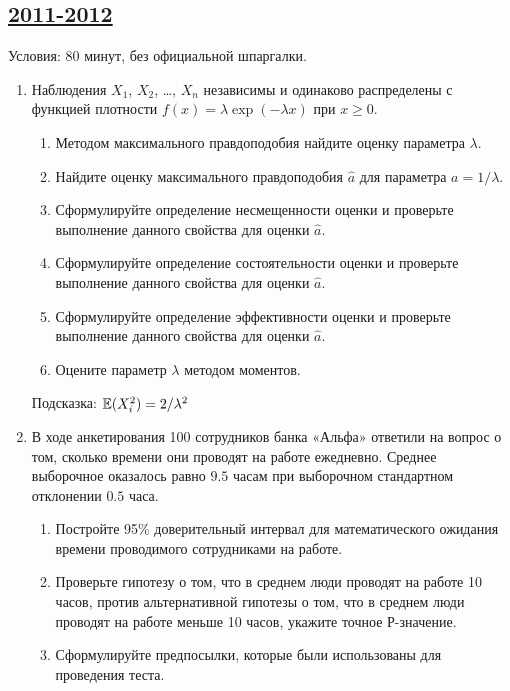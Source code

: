 
\subsection[2011-2012]{\hyperref[sec:sol_kr_03_2011_2012]{2011-2012}}
\label{sec:kr_03_2011_2012}


Условия: 80 минут, без официальной шпаргалки.

\begin{enumerate}
\item Наблюдения $X_1$, $X_2$, \ldots, $X_n$ независимы и одинаково распределены с функцией плотности $f(x)=\lambda \exp(-\lambda x)$ при $x\geq 0$.
\begin{enumerate}
\item Методом максимального правдоподобия найдите оценку параметра  $\lambda$.
\item Найдите оценку максимального правдоподобия $\hat{a}$ для параметра $a=1/\lambda$.
\item Сформулируйте определение несмещенности оценки и проверьте выполнение данного свойства для оценки $\hat{a}$.
\item Сформулируйте определение состоятельности оценки и проверьте выполнение данного свойства для оценки $\hat{a}$.
\item Сформулируйте определение эффективности  оценки и проверьте выполнение данного свойства для оценки $\hat{a}$.
\item Оцените параметр $\lambda$ методом моментов.
\end{enumerate}
Подсказка: $\operatorname{\mathbb{E}}(X_i^2)=2/\lambda^2$

\item В ходе анкетирования 100 сотрудников банка «Альфа» ответили на вопрос о том, сколько времени они проводят на работе ежедневно. Среднее выборочное оказалось равно $9.5$ часам при выборочном стандартном отклонении $0.5$ часа.
\begin{enumerate}
\item Постройте 95\% доверительный интервал для математического ожидания времени проводимого сотрудниками на работе.
\item Проверьте гипотезу о том, что в среднем люди проводят на работе 10 часов, против альтернативной гипотезы о том, что в среднем люди проводят на работе меньше 10 часов, укажите точное Р-значение.
\item Сформулируйте предпосылки, которые были использованы для проведения теста.
\end{enumerate}


\end{enumerate}
